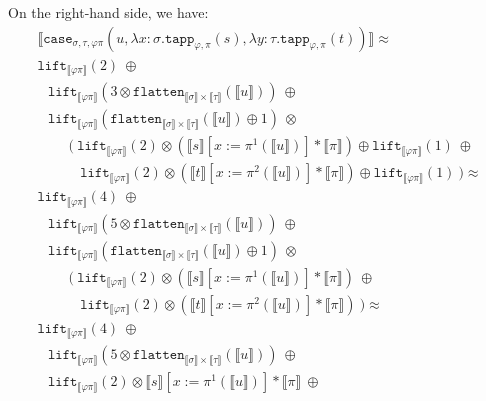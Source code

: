 \documentclass[runningheads,a4paper]{llncs}
\newcommand{\typeinterpret}[1]{\llbracket #1 \rrbracket}
\newcommand{\interpret}[1]{\llbracket #1 \rrbracket}
\newcommand{\abs}[2]{\lambda #1.#2}
\newcommand{\flatten}{\mathtt{flatten}}
\newcommand{\lift}{\mathtt{lift}}
\begin{document}
\begin{itemize}
  On the right-hand side, we have:
  \[
  \begin{array}{l}
  \interpret{\mathtt{case}_{\sigma,\tau,\varphi\pi}(u,
    \abs{x:\sigma}{\mathtt{tapp}_{\varphi,\pi}(s)},
    \abs{y:\tau}{\mathtt{tapp}_{\varphi,\pi}(t)})} \approx \\
  \lift_{\typeinterpret{\varphi\pi}}(2)\ \oplus \\
  \phantom{A}
  \lift_{\typeinterpret{\varphi\pi}}(3 \otimes \flatten_{
    \typeinterpret{\sigma} \times \typeinterpret{\tau}}(
    \interpret{u}))\ \oplus \\
  \phantom{A}
  \lift_{\typeinterpret{\varphi\pi}}(\flatten_{\typeinterpret{\sigma}
    \times \typeinterpret{\tau}}(\interpret{u}) \oplus 1)\ \otimes \\
  \phantom{ABC}(\ 
    \lift_{\typeinterpret{\varphi\pi}}(2) \otimes
    (\typeinterpret{s}[x:=\pi^1(\interpret{u})]
      * \typeinterpret{\pi}) \oplus
    \lift_{\typeinterpret{\varphi\pi}}(1)\ \oplus \\
  \phantom{ABCD}
    \lift_{\typeinterpret{\varphi\pi}}(2) \otimes
    (\typeinterpret{t}[x:=\pi^2(\interpret{u})]
      * \typeinterpret{\pi}) \oplus
    \lift_{\typeinterpret{\varphi\pi}}(1)
  \ ) \approx \\
  \lift_{\typeinterpret{\varphi\pi}}(4)\ \oplus \\
  \phantom{A}
  \lift_{\typeinterpret{\varphi\pi}}(5 \otimes \flatten_{
    \typeinterpret{\sigma} \times \typeinterpret{\tau}}(
    \interpret{u}))\ \oplus \\
  \phantom{A}
  \lift_{\typeinterpret{\varphi\pi}}(\flatten_{\typeinterpret{\sigma}
    \times \typeinterpret{\tau}}(\interpret{u}) \oplus 1)\ \otimes \\
  \phantom{ABC}(\ 
    \lift_{\typeinterpret{\varphi\pi}}(2) \otimes
    (\typeinterpret{s}[x:=\pi^1(\interpret{u})]
      * \typeinterpret{\pi})\ \oplus \\
  \phantom{ABCD}
    \lift_{\typeinterpret{\varphi\pi}}(2) \otimes
    (\typeinterpret{t}[x:=\pi^2(\interpret{u})]
      * \typeinterpret{\pi})
  \ ) \approx \\
  \lift_{\typeinterpret{\varphi\pi}}(4)\ \oplus \\
  \phantom{A}
  \lift_{\typeinterpret{\varphi\pi}}(5 \otimes \flatten_{
    \typeinterpret{\sigma} \times \typeinterpret{\tau}}(
    \interpret{u}))\ \oplus \\
  \phantom{A}
  \lift_{\typeinterpret{\varphi\pi}}(2) \otimes
    \interpret{s}[x:=\pi^1(\interpret{u})] * \typeinterpret{\pi}\ \oplus\\

\end{array}\]
\end{itemize}
\end{document}
